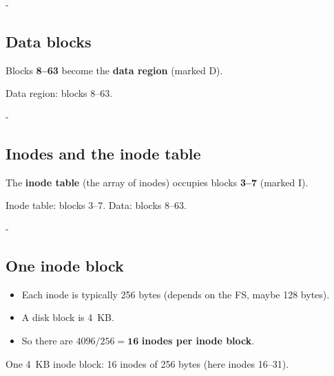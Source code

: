 \documentclass[11pt,a4paper]{article}
\makeatletter
\newcommand{\keepspace}[1]{\par\penalty-100\begingroup
  \setlength{\dimen@}{#1}\dimen@ii\pagegoal\advance\dimen@ii-\pagetotal
  \ifdim\dimen@>\dimen@ii\ifdim\dimen@ii>\z@\vfil\fi\break\fi\endgroup}
\newcommand{\fsgrid}[3]{%
  \foreach \bb in {0,...,63} {
    \pgfmathtruncatemacro{\rr}{\bb/16}
    \pgfmathtruncatemacro{\cc}{mod(\bb,16)}
    \pgfmathsetmacro{\xx}{\cc*0.71 + (\cc>7)*0.5}
    \ifnum\bb<8
      \node[blk, fill=white] (b\bb) at (\xx, -\rr*1.0) {};
    \else
      \node[blk, fill=#2] (b\bb) at (\xx, -\rr*1.0) {#1};
    \fi
  }
  \foreach \n/\l/\f in {#3} { \node[blk, \f] at (b\n) {\l}; }
  \foreach \rr in {0,...,3} {
    \foreach \s/\e in {0/7,8/15} {
      \pgfmathtruncatemacro{\bs}{\rr*16+\s}
      \pgfmathtruncatemacro{\be}{\rr*16+\e}
      \node[font=\scriptsize, inner sep=1pt, below=0pt of b\bs.south] {\bs};
      \node[font=\scriptsize, inner sep=1pt, below=0pt of b\be.south] {\be};
    }
  }
}
\makeatother
\begin{document}
\keepspace{8\baselineskip}
\subsection{Data blocks}

Blocks \textbf{8--63} become the \textbf{data region} (marked D).

\begin{center}

{\small Data region: blocks 8--63.}
\end{center}

\keepspace{8\baselineskip}
\subsection{Inodes and the inode table}

The \textbf{inode table} (the array of inodes) occupies blocks \textbf{3--7}
(marked I).

\begin{center}

{\small Inode table: blocks 3--7. Data: blocks 8--63.}
\end{center}

\keepspace{8\baselineskip}
\subsection{One inode block}

\begin{itemize}
  \item Each inode is typically 256 bytes (depends on the FS, maybe 128
        bytes).
  \item A disk block is 4~KB.
  \item So there are \(4096/256 = \mathbf{16}\) \textbf{inodes per inode
        block}.
\end{itemize}

\begin{center}

{\small One 4~KB inode block: 16 inodes of 256 bytes (here inodes 16--31).}
\end{center}
\end{document}
